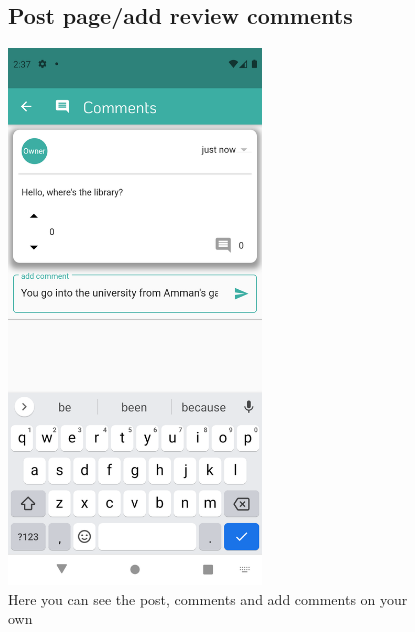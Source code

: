 \documentclass[12pt]{article}
\begin{document}
\begin{figure}[h!]
\vspace{-2cm}
  \subsection*{Post page/add review comments}
\centerline{\includegraphics[width=0.6\textwidth]{./Screenshots/14.PNG}}
  \caption{Here you can see the post, comments and add comments on your own}
  \end{figure}
\end{document}
